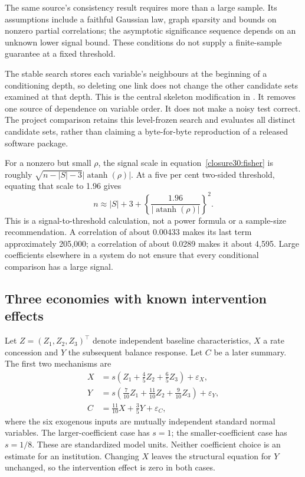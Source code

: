 The same source's consistency result requires more than a large sample. Its
assumptions include a faithful Gaussian law, graph sparsity and bounds on
nonzero partial correlations; the asymptotic significance sequence depends on
an unknown lower signal bound. These conditions do not supply a finite-sample
guarantee at a fixed threshold. \citep[Assumptions A1--A4 and Theorem 1,
pp.~619--620]{kalisch2007}

The stable search stores each variable's neighbours at the beginning of a
conditioning depth, so deleting one link does not change the other candidate
sets examined at that depth. This is the central skeleton modification in
\citet[Section 4.1, Algorithm 4.1 and Theorem 3]{exec13_latentr_colombo2014}. It removes
one source of dependence on variable order. It does not make a noisy test
correct. The project comparison retains this level-frozen search and evaluates
all distinct candidate sets, rather than claiming a byte-for-byte reproduction
of a released software package.

For a nonzero but small $\rho$, the signal scale in
equation~\ref{closure30:fisher} is roughly
$\sqrt{n-|S|-3}|\operatorname{atanh}(\rho)|$. At a five per cent two-sided
threshold, equating that scale to 1.96 gives
\begin{equation}
 n\approx |S|+3+
 \left\{\frac{1.96}{|\operatorname{atanh}(\rho)|}\right\}^{2}.
 \label{closure30:signal-scale}
\end{equation}
This is a signal-to-threshold calculation, not a power formula or a sample-size
recommendation. A correlation of about 0.00433 makes its last term approximately
205,000; a correlation of about 0.0289 makes it about 4,595. Large coefficients
elsewhere in a system do not ensure that every conditional comparison has a
large signal.

\subsection{Three economies with known intervention effects}

Let $Z=(Z_1,Z_2,Z_3)^\top$ denote independent baseline characteristics,
$X$ a rate concession and $Y$ the subsequent balance response. Let $C$ be a
later summary. The first two mechanisms are
\begin{align}
 X&=s\left(Z_1+\frac45Z_2+\frac65Z_3\right)+\varepsilon_X,\\
 Y&=s\left(\frac7{10}Z_1+\frac{11}{10}Z_2+
                 \frac9{10}Z_3\right)+\varepsilon_Y,\\
 C&=\frac{11}{10}X+\frac35Y+\varepsilon_C,
 \label{closure30:sampling-economy}
\end{align}
where the six exogenous inputs are mutually independent standard normal
variables. The larger-coefficient case has $s=1$; the smaller-coefficient case
has $s=1/8$. These are standardized model units. Neither coefficient choice is
an estimate for an institution. Changing $X$ leaves the structural equation
for $Y$ unchanged, so the intervention effect is zero in both cases.

